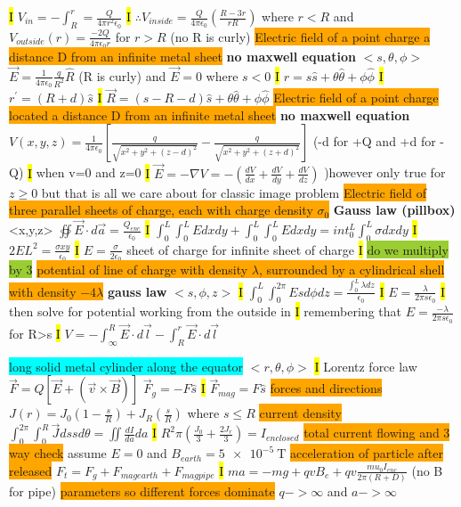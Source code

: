 \documentclass[fontsize=4pt]{scrartcl}
\begin{document}
\hl{I}
$V_{in} = -\int_{R}^{r}=\frac{Q}{4\pi r^2 \epsilon_0}$
\hl{I}
$\therefore V_{inside}=\frac{Q}{4 \pi \epsilon_0}(\frac{R-3r}{rR})$ where $r<R$ and $V_{outside}(r)=\frac{-2Q}{4\pi \epsilon_0 r}$ for $r>R$ (no R is curly)
\colorbox{Orange}{Electric field of a point charge a distance D from an infinite metal sheet}
\textbf{no maxwell equation} $<s,\theta,\phi>$
$\vec{E} = \frac{1}{4\pi \epsilon_0}\frac{q}{R^2}\hat{R}$ (R is curly) and $\vec{E}=0$ where $s < 0$
\hl{I}
$r = s\hat{s}+\theta \hat{\theta} + \phi \hat{\phi}$
\hl{I}
$r^{\prime} = (R+d)\hat{s}$
\hl{I}
$\vec{R} = (s-R-d)\hat{s}+\theta\hat{\theta} +\phi \hat{\phi}$
\colorbox{Orange}{Electric field of a point charge located a distance D from an infinite metal sheet}
\textbf{no maxwell equation} $V(x,y,z)=\frac{1}{4\pi \epsilon_0}[\frac{q}{\sqrt{x^2 + y^2 + (z-d)^2}} - \frac{q}{\sqrt{x^2 + y^2 + (z+d)^2}} ]$ (-d for +Q and +d for -Q)
\hl{I}
when v=0 and z=0
\hl{I}
$\vec{E} = -\nabla V = -(\frac{dV}{dx} + \frac{dV}{dy} + \frac{dV}{dz})$ )however only true for $z \geq 0$ but that is all we care about for classic image problem
\colorbox{Orange}{Electric field of three parallel sheets of charge, each with charge density $\sigma_0$}
\textbf{Gauss law (pillbox)}<x,y,z>
$\oiint \vec{E} \cdot d\vec{a} = \frac{Q_{enc}}{\epsilon_0}$
\hl{I}
$\int_{0}^{L}\int_{0}^{L}Edxdy + \int_{0}^{L}\int_{0}^{L}Edxdy = int_{0}^{L}\int_{0}^{L}\sigma dxdy$
\hl{I}
$2EL^2 = \frac{\sigma x y}{\epsilon_0}$
\hl{I}
$E=\frac{\sigma}{2\epsilon_0}$ sheet of charge for infinite sheet of charge
\hl{I}
\colorbox{YellowGreen}{do we multiply by 3}
\colorbox{Orange}{potential of line of charge with density $\lambda$, surrounded by a cylindrical shell with density $-4\lambda$}
\textbf{gauss law}
$<s,\phi,z>$
\hl{I}
$\int_{0}^L \int_0^{2\pi} E s d\phi dz = \frac{\int_{0}^{L} \lambda dz}{\epsilon_0}$
\hl{I}
$E=\frac{\lambda}{2\pi s \epsilon_0}$
\hl{I}
then solve for potential working from the outside in
\hl{I}
remembering that $E=\frac{-\lambda}{2\pi s \epsilon_0}$ for R>s
\hl{I}
$V=-\int_{\infty}^{R}\vec{E}\cdot d\vec{l} -\int_{R}^{r}\vec{E}\cdot d\vec{l}$

\colorbox{Cyan}{long solid metal cylinder along the equator}
$<r,\theta,\phi>$
\hl{I}
Lorentz force law $\vec{F} =Q[\vec{E}+(\vec{v} \times \vec{B})]$
$\vec{F}_g= -F \hat{s}$
\hl{I}
$\vec{F}_{mag}=F\hat{s}$
\colorbox{Orange}{forces and directions}
$J(r)=J_0(1-\frac{s}{R})+J_R(\frac{s}{R})$ where $s\leq R$
\colorbox{Orange}{current density}
$\int_{0}^{2\pi} \int_{0}^{R} \vec{J} ds s d\theta = \iint \frac{dI}{da}da$
\hl{I}
$R^2 \pi (\frac{J_0}{3}+\frac{2 J_r}{3}) = I_{enclosed}$
\colorbox{Orange}{total current flowing and 3 way check}
assume $E=0$ and $B_{earth} = \SI{5e-5}{\tesla}$
\colorbox{Orange}{acceleration of particle after released}
$F_t = F_g + F_{mag earth} + F_{magpipe}$
\hl{I}
$ma = -mg + qvB_e + qv\frac{mu_0 I_{enc}}{2\pi(R+D)}$
(no B for pipe) 
\colorbox{Orange}{parameters so different forces dominate}
$q -> \infty$ and $a->\infty $
\end{document}
